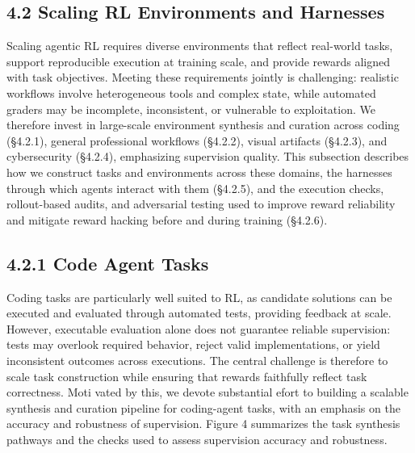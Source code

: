 \documentclass[
  10
]{article}
\begin{document}
\subsection{4.2 Scaling RL Environments and
Harnesses}\label{scaling-rl-environments-and-harnesses}

Scaling agentic RL requires diverse environments that reflect real-world
tasks, support reproducible execution at training scale, and provide
rewards aligned with task objectives. Meeting these requirements jointly
is challenging: realistic workflows involve heterogeneous tools and
complex state, while automated graders may be incomplete, inconsistent,
or vulnerable to exploitation. We therefore invest in large-scale
environment synthesis and curation across coding (§4.2.1), general
professional workflows (§4.2.2), visual artifacts (§4.2.3), and
cybersecurity (§4.2.4), emphasizing supervision quality. This subsection
describes how we construct tasks and environments across these domains,
the harnesses through which agents interact with them (§4.2.5), and the
execution checks, rollout-based audits, and adversarial testing used to
improve reward reliability and mitigate reward hacking before and during
training (§4.2.6).

\subsection{4.2.1 Code Agent Tasks}\label{code-agent-tasks}

Coding tasks are particularly well suited to RL, as candidate solutions
can be executed and evaluated through automated tests, providing
feedback at scale. However, executable evaluation alone does not
guarantee reliable supervision: tests may overlook required behavior,
reject valid implementations, or yield inconsistent outcomes across
executions. The central challenge is therefore to scale task
construction while ensuring that rewards faithfully reflect task
correctness. Moti vated by this, we devote substantial efort to building
a scalable synthesis and curation pipeline for coding-agent tasks, with
an emphasis on the accuracy and robustness of supervision. Figure 4
summarizes the task synthesis pathways and the checks used to assess
supervision accuracy and robustness.
\end{document}
